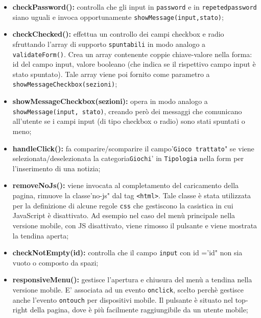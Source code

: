 \begin{itemize}
	\item \textbf{checkPassword(): } controlla che gli input in \texttt{password} e in \texttt{repetedpassword} siano uguali e invoca opportunamente \texttt{showMessage(input,stato)}; \\

	\item \textbf{checkChecked(): } effettua un controllo dei campi checkbox e radio sfruttando l'array di supporto \texttt{spuntabili} in modo analogo a \texttt{validateForm()}. Crea un array contenente coppie chiave-valore nella forma: id del campo input, valore booleano (che indica se il rispettivo campo input è stato spuntato). Tale array viene poi fornito come parametro a \texttt{showMessageCheckbox(sezioni)}; \\

	\item \textbf{showMessageCheckbox(sezioni): } opera in modo analogo a \texttt{showMessage(input, stato)}, creando però dei messaggi che comunicano all'utente se i campi input (di tipo checkbox o radio) sono stati spuntati o meno; \\

	\item \textbf{handleClick(): } fa comparire/scomparire il campo'\texttt{Gioco trattato}" se viene selezionata/deselezionata la categoria\texttt{Giochi}' in \texttt{Tipologia} nella form per l'inserimento di una notizia; \\

	\item \textbf{removeNoJs(): }  viene invocata al completamento del caricamento della pagina, rimuove la classe'no-js" dal tag \texttt{<html>}. Tale classe è stata utilizzata per la definizione di alcune regole \texttt{css} che gestiscono la casistica in cui JavaScript è disattivato. Ad esempio nel caso del menù principale nella versione mobile, con JS disattivato, viene rimosso il pulsante e viene mostrata la tendina aperta; \\

	\item \textbf{checkNotEmpty(id): } controlla che il campo \texttt{input} con id ='id" non sia vuoto o composto da spazi; \\

	\item \textbf{responsiveMenu(): } gestisce l'apertura e chiusura del menù a tendina nella versione mobile.
	E' associata ad un evento \texttt{onclick}, scelto perchè gestisce anche l'evento \texttt{ontouch} per dispositivi mobile.
	Il pulsante è situato nel top-right della pagina, dove è più facilmente raggiungibile da un utente mobile; \\


\end{itemize}
